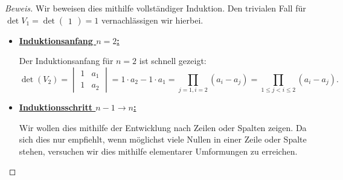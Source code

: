\documentclass[12pt, a4paper, oneside, titlepage]{report}
\newenvironment{bew}{\begin{proof}[Beweis]}{\end{proof}}
\theoremstyle{definition}
\begin{document}
	\begin{bew}
		Wir beweisen dies mithilfe vollständiger Induktion. \cite{vandermonde} Den trivialen Fall für $ \det V_1 = \det \begin{pmatrix}1\end{pmatrix} = 1 $ vernachlässigen wir hierbei.
		
		\begin{itemize}
			\item {\underline{\textbf{Induktionsanfang $ n=2 $:}}
				
				Der Induktionsanfang für $ n=2 $ ist schnell gezeigt:
				$$ \det (V_2) = \begin{vmatrix}1&a_1\\1&a_2\end{vmatrix} = 1 \cdot a_2 - 1 \cdot a_1 = \prod_{j=1, i=2} (a_i-a_j) = \prod_{1 \leq j < i \leq 2} (a_i-a_j).$$
			}
			\item {\underline{\textbf{Induktionsschritt $ n - 1 \rightarrow n $:}}
				
				Wir wollen dies mithilfe der Entwicklung nach Zeilen oder Spalten zeigen. Da sich dies nur empfiehlt, wenn möglichst viele Nullen in einer Zeile oder Spalte stehen, versuchen wir dies mithilfe elementarer Umformungen zu erreichen.
				
}
\end{itemize}
\end{bew}
\end{document}
